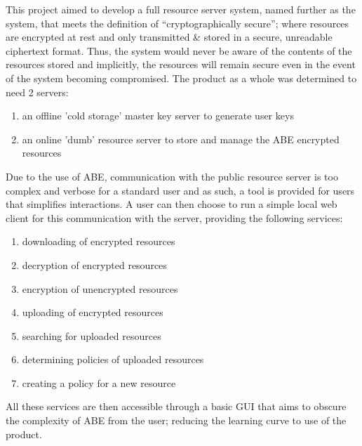 This project aimed to develop a full resource server system, named further as the \theResServer system, that meets the definition of ``cryptographically secure''; where resources are encrypted at rest and only transmitted \& stored in a secure, unreadable ciphertext format. Thus, the system would never be aware of the contents of the resources stored and implicitly, the resources will remain secure even in the event of the system becoming compromised. The product as a whole was determined to need 2 servers:
\begin{enumerate}
  \item an offline 'cold storage' master key server to generate user keys
  \item an online 'dumb' resource server to store and manage the ABE encrypted resources
\end{enumerate}
Due to the use of ABE, communication with the public resource server is too complex and verbose for a standard user and as such, a tool is provided for users that simplifies interactions. A user can then choose to run a simple local web client for this communication with the server, providing the following services:
\begin{enumerate}
  \item downloading of encrypted resources
  \item decryption of encrypted resources
  \item encryption of unencrypted resources
  \item uploading of encrypted resources
  \item searching for uploaded resources
  \item determining policies of uploaded resources
  \item creating a policy for a new resource
\end{enumerate}
All these services are then accessible through a basic GUI that aims to obscure the complexity of ABE from the user; reducing the learning curve to use of the product.
